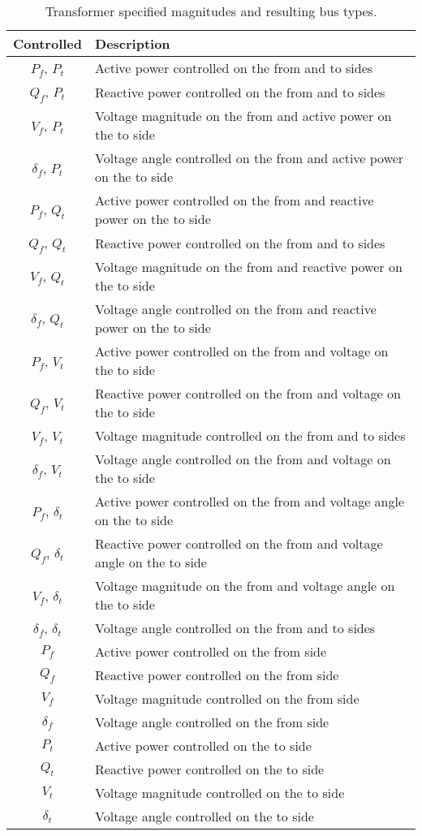 \documentclass[11pt]{article}
\begin{document}
	\begin{table}[!htb]\centering
		\caption{Transformer specified magnitudes and resulting bus types.}
			\begin{tabular}{cp{12cm}}
				\hline
				\textbf{Controlled} & \textbf{Description} \\
				\hline
				\hline
				$P_f$, $P_t$ & Active power controlled on the from and to sides \\
				$Q_f$, $P_t$ & Reactive power controlled on the from and to sides \\
				$V_f$, $P_t$ & Voltage magnitude on the from and active power on the to side \\
				$\delta_f$, $P_t$ & Voltage angle controlled on the from and active power on the to side \\
				$P_f$, $Q_t$ & Active power controlled on the from and reactive power on the to side \\
				$Q_f$, $Q_t$ & Reactive power controlled on the from and to sides \\
				$V_f$, $Q_t$ & Voltage magnitude on the from and reactive power on the to side \\
				$\delta_f$, $Q_t$ & Voltage angle controlled on the from and reactive power on the to side \\
				$P_f$, $V_t$ & Active power controlled on the from and voltage on the to side \\
				$Q_f$, $V_t$ & Reactive power controlled on the from and voltage on the to side \\
				$V_f$, $V_t$ & Voltage magnitude controlled on the from and to sides \\
				$\delta_f$, $V_t$ & Voltage angle controlled on the from and voltage on the to side \\
				$P_f$, $\delta_t$ & Active power controlled on the from and voltage angle on the to side \\
				$Q_f$, $\delta_t$ & Reactive power controlled on the from and voltage angle on the to side \\
				$V_f$, $\delta_t$ & Voltage magnitude on the from and voltage angle on the to side \\
				$\delta_f$, $\delta_t$ & Voltage angle controlled on the from and to sides \\
				$P_f$ & Active power controlled on the from side \\
				$Q_f$ & Reactive power controlled on the from side \\
				$V_f$ & Voltage magnitude controlled on the from side \\
				$\delta_f$ & Voltage angle controlled on the from side \\
				$P_t$ & Active power controlled on the to side \\
				$Q_t$ & Reactive power controlled on the to side \\
				$V_t$ & Voltage magnitude controlled on the to side \\
				$\delta_t$ & Voltage angle controlled on the to side \\
				\hline
			\end{tabular}
	\end{table}
\end{document}
